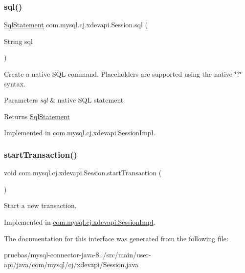 \subsubsection{\texorpdfstring{sql()}{sql()}}
{\footnotesize\ttfamily \mbox{\hyperlink{interfacecom_1_1mysql_1_1cj_1_1xdevapi_1_1_sql_statement}{Sql\+Statement}} com.\+mysql.\+cj.\+xdevapi.\+Session.\+sql (\begin{DoxyParamCaption}\item[{String}]{sql }\end{DoxyParamCaption})}

Create a native S\+QL command. Placeholders are supported using the native \char`\"{}?\char`\"{} syntax.


\begin{DoxyParams}{Parameters}
{\em sql} & native S\+QL statement \\
\hline
\end{DoxyParams}
\begin{DoxyReturn}{Returns}
\mbox{\hyperlink{interfacecom_1_1mysql_1_1cj_1_1xdevapi_1_1_sql_statement}{Sql\+Statement}} 
\end{DoxyReturn}


Implemented in \mbox{\hyperlink{classcom_1_1mysql_1_1cj_1_1xdevapi_1_1_session_impl_a28b412626c5f92aa146ede32d4e8033d}{com.\+mysql.\+cj.\+xdevapi.\+Session\+Impl}}.

\mbox{\label{interfacecom_1_1mysql_1_1cj_1_1xdevapi_1_1_session_a1c0d0951a9c3f1d92f9bd22f337dd86c}} 
\subsubsection{\texorpdfstring{start\+Transaction()}{startTransaction()}}
{\footnotesize\ttfamily void com.\+mysql.\+cj.\+xdevapi.\+Session.\+start\+Transaction (\begin{DoxyParamCaption}{ }\end{DoxyParamCaption})}

Start a new transaction. 

Implemented in \mbox{\hyperlink{classcom_1_1mysql_1_1cj_1_1xdevapi_1_1_session_impl_a765f8d81a34ca32d608bdeb5e56e3119}{com.\+mysql.\+cj.\+xdevapi.\+Session\+Impl}}.



The documentation for this interface was generated from the following file\+:\begin{DoxyCompactItemize}
\item 
pruebas/mysql-\/connector-\/java-\/8../src/main/user-\/api/java/com/mysql/cj/xdevapi/Session.\+java\end{DoxyCompactItemize}
